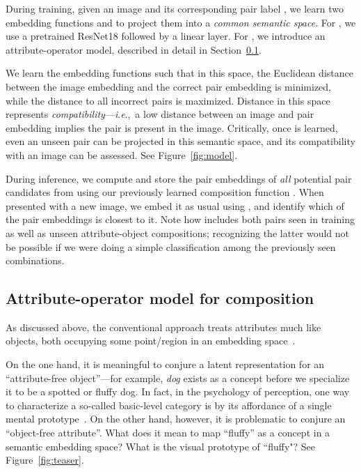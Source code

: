 \documentclass[runningheads]{llncs}
\newcommand{\ie}{\textit{i}.\textit{e}.,~}
\newcommand{\reffig}[1]{Figure~\ref{#1}}
\newcommand{\refsec}[1]{Section~\ref{#1}}
\begin{document}
During training, given an image  and its corresponding pair label , we learn two embedding functions  and  to project them into a \emph{common semantic space}.  
For , we use a pretrained ResNet18 \cite{he2016deep} followed by a linear layer. For , we introduce an attribute-operator model, described in detail in \refsec{sec:attr_embedding}.

We learn the embedding functions such that in this space, the Euclidean distance between the image embedding  and the correct pair embedding  is minimized, while the distance to all incorrect pairs is maximized.
Distance in this space represents \emph{compatibility}---\ie a low distance between an image and pair embedding implies the pair is present in the image.  Critically, once  is learned, even an unseen pair can be projected in this semantic space, and its compatibility with an image can be assessed.  See \reffig{fig:model}.

During inference, we compute and store the pair embeddings of \emph{all}  potential pair candidates from  using our previously learned composition function . When presented with a new image, we embed it as usual using , and identify which of the pair embeddings is closest to it. Note how  includes both pairs seen in training as well as unseen attribute-object compositions; 
recognizing the latter would not be possible if we were doing a simple classification among the previously seen combinations.

\vspace*{-0.1in}
\subsection{Attribute-operator model for composition} \label{sec:attr_embedding}

As discussed above, the conventional approach treats attributes much like objects, both occupying some point/region in an embedding space~\cite{siddiquie-feris-cvpr2011,walk-learn-cvpr2016,face-attributes-iccv2015,yongjae-stn,lu-feris-cvpr2017,su-eccv2016,dinesh-cvpr2014,elhoseiny-cvpr2015}.

On the one hand, it is meaningful to conjure a latent representation for an ``attribute-free object''---for example, \emph{dog} exists as a concept before we specialize it to be a spotted or fluffy dog.  In fact, in the psychology of perception, one way to characterize a so-called basic-level category is by its affordance of a single mental prototype~\cite{rosch1976basic}.  
On the other hand, however, it is problematic to conjure an ``object-free attribute''.  What does it mean to map ``fluffy'' as a concept in a semantic embedding space?  What is the visual prototype of ``fluffy"?  See Figure~\ref{fig:teaser}.
\end{document}
